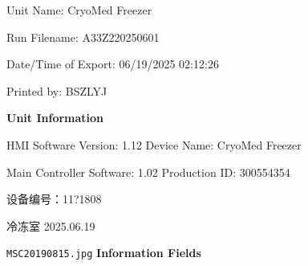 \documentclass[UTF8,10pt,a4paper,fontset=fandol]{ctexart}
\newcommand{\fieldvalue}[1]{#1}
\newcommand{\handwritten}[1]{#1}
\begin{document}
\noindent
Unit Name:
\fieldvalue{CryoMed Freezer}

\noindent
Run Filename:
\fieldvalue{A33Z220250601}

\noindent
Date/Time of Export:
\fieldvalue{06/19/2025 02:12:26}

\noindent
Printed by:
\fieldvalue{BSZLYJ}

\medskip
\noindent\textbf{Unit Information}

\noindent\hspace{1.5em}HMI Software Version:
\fieldvalue{1.12}
\hfill
Device Name:
\fieldvalue{CryoMed Freezer}

\noindent\hspace{1.5em}Main Controller Software:
\fieldvalue{1.02}
\hfill
Production ID:
\fieldvalue{300554354}

\smallskip
\fieldvalue{\handwritten{设备编号：11?1808}}

\noindent\hfill
\fieldvalue{\handwritten{冷冻室 2025.06.19}}

\medskip
\begin{center}
\end{center}

\begin{center}
\fieldvalue{\texttt{MSC20190815.jpg}}
\hspace{3cm}
\textbf{Information Fields}
\end{center}
\end{document}
